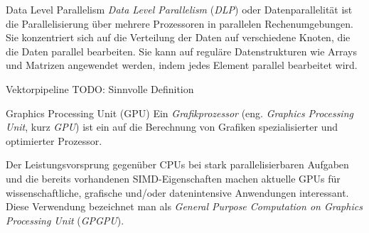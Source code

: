 \begin{defi}{Data Level Parallelism}
    \emph{Data Level Parallelism} (\emph{DLP}) oder Datenparallelität ist die Parallelisierung über mehrere Prozessoren in parallelen Rechenumgebungen.
    Sie konzentriert sich auf die Verteilung der Daten auf verschiedene Knoten, die die Daten parallel bearbeiten.
    Sie kann auf reguläre Datenstrukturen wie Arrays und Matrizen angewendet werden, indem jedes Element parallel bearbeitet wird.
\end{defi}

\begin{defi}{Vektorpipeline}
    TODO: Sinnvolle Definition
\end{defi}

\begin{defi}{Graphics Processing Unit (GPU)}
    Ein \emph{Grafikprozessor} (eng. \emph{Graphics Processing Unit}, kurz \emph{GPU})  ist ein auf die Berechnung von Grafiken spezialisierter und optimierter Prozessor.

    Der Leistungsvorsprung gegenüber CPUs bei stark parallelisierbaren Aufgaben und die bereits vorhandenen SIMD-Eigenschaften machen aktuelle GPUs für wissenschaftliche, grafische und/oder datenintensive Anwendungen interessant.
    Diese Verwendung bezeichnet man als \emph{General Purpose Computation on Graphics Processing Unit} (\emph{GPGPU}).
\end{defi}

